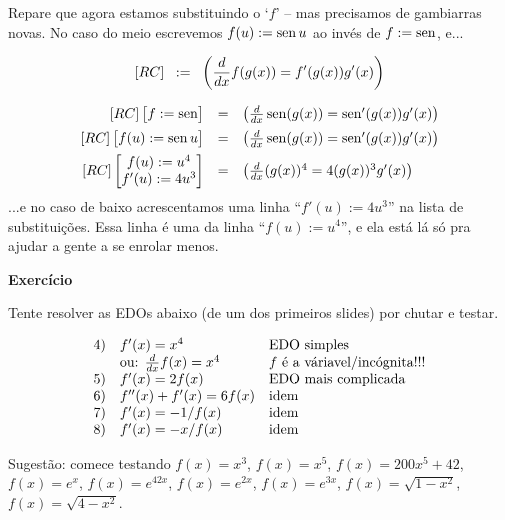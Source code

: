 \documentclass[oneside,12pt]{article}
\begin{document}
Repare que agora estamos substituindo o `$f$'  -- mas precisamos de gambiarras novas. No caso
do meio escrevemos $f(u) := \operatorname{sen} u$ ao invés de $f := \operatorname{sen}$, e...


\newpage


$$[RC] \;\; := \;\; \left( \frac{d}{dx} f(g(x)) = f'(g(x))g'(x) \right)$$

$$\begin{array}{rcl}
  [RC] \left [\begin{matrix}f := \operatorname{sen}\end{matrix}\right ] &=&
     \left( \frac{d}{dx} \operatorname{sen}(g(x)) = \operatorname{sen}'(g(x))g'(x) \right) \\[5pt]
  [RC] \left [\begin{matrix}f(u) := \operatorname{sen} u\end{matrix}\right ] &=&
     \left( \frac{d}{dx} \operatorname{sen}(g(x)) = \operatorname{sen}'(g(x))g'(x) \right) \\[5pt]
  [RC] \left [\begin{matrix}f(u) := u^4 \\ f'(u) := 4u^3 \end{matrix}\right ] &=&
     \left( \frac{d}{dx} (g(x))^4 = 4(g(x))^3g'(x) \right) \\
  \end{array}
$$
%
...e no caso de baixo acrescentamos uma linha ``$f'(u) := 4u^3$'' na
lista de substituições. Essa linha é uma  da
linha ``$f(u) := u^4$'', e ela está lá só pra ajudar a gente a se
enrolar menos.

\newpage

{\bf Exercício}

Tente resolver as EDOs abaixo (de um dos primeiros slides) por chutar
e testar.

$$\begin{array}{rll}
 4) & f'(x) = x^4                 & \text{EDO simples} \\
    & \text{ou: } \frac{d}{dx} f(x) = x^4 & \text{$f$ é a váriavel/incógnita!!!} \\
 5) & f'(x) = 2f(x)               & \text{EDO mais complicada} \\
 6) & f''(x) + f'(x) = 6f(x)      & \text{idem} \\
 7) & f'(x) = -1/f(x)             & \text{idem} \\
 8) & f'(x) = -x/f(x)             & \text{idem} \\
 \end{array}
$$

Sugestão: comece testando $f(x) = x^3$, $f(x) = x^5$, $f(x) = 200x^5 +
42$, $f(x) = e^x$, $f(x) = e^{42x}$, $f(x) = e^{2x}$, $f(x)=e^{3x}$,
$f(x) = \sqrt{1-x^2}$, $f(x) = \sqrt{4-x^2}$.
\end{document}
